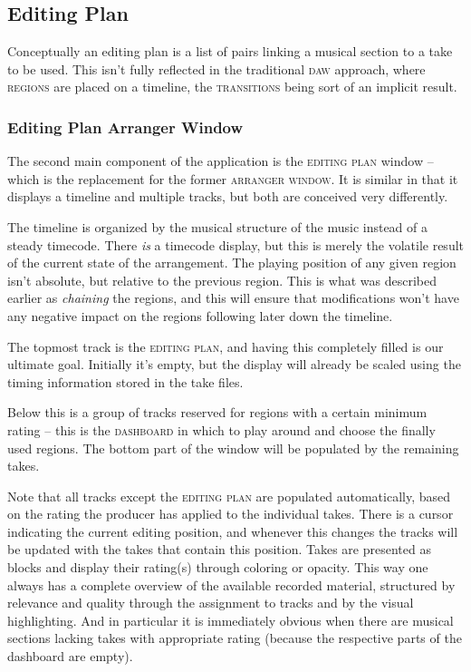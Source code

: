 \documentclass[11pt,a4paper]{article}
\newcommand*{\term}[1]{\textsc{#1}}
\begin{document}
\subsection{Editing Plan}
Conceptually an editing plan is a list of pairs linking a musical section to
a take to be used. This isn't fully reflected in the traditional \textsc{daw}
approach, where \term{regions} are placed on a timeline,
the \term{transitions} being sort of an implicit result.


\subsubsection{Editing Plan Arranger Window}
The second main component of the application is the \term{editing plan} window
-- which is the replacement for the former \term{arranger window}.
It is similar in that it displays a timeline and multiple tracks, but both are
conceived very differently.

The timeline is organized by the musical structure of the music instead of a
steady timecode.
There \emph{is} a timecode display, but this is merely the volatile result of
the current state of the arrangement.
The playing position of any given region isn't absolute, but relative to the
previous region.
This is what was described earlier as \emph{chaining} the regions, and this will
ensure that modifications won't have any negative impact on the regions following
later down the timeline.

The topmost track is the \term{editing plan}, and having this completely filled
is our ultimate goal.
Initially it's empty, but the display will already be scaled using the timing
information stored in the take files.

Below this is a group of tracks reserved for regions with a certain minimum
rating -- this is the \term{dashboard} in which to play around and choose the finally
used regions.
The bottom part of the window will be populated by the remaining takes.

Note that all tracks except the \term{editing plan} are populated automatically, based
on the rating the producer has applied to the individual takes.
There is a cursor indicating the current editing position, and
whenever this changes the tracks will be updated with the takes that contain
this position.
Takes are presented as blocks and display their rating(s) through coloring or opacity.
This way one always has a complete overview of the available recorded material,
structured by relevance and quality through the assignment to tracks and by the
visual highlighting.
And in particular it is immediately obvious when there are musical sections lacking
takes with appropriate rating (because the respective parts of the
dashboard are empty).
\end{document}

